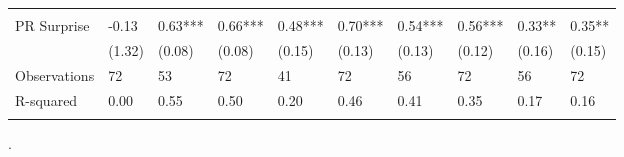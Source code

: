 \documentclass{article}
\begin{document}
\begin{table}[tbp] \centering
{}

\label{tab:}
\begin{tabularx}{\linewidth}{lCCCCCCCCC}

\toprule
 \tabularnewline
PR Surprise&-0.13&0.63***&0.66***&0.48***&0.70***&0.54***&0.56***&0.33**&0.35** \tabularnewline
&(1.32)&(0.08)&(0.08)&(0.15)&(0.13)&(0.13)&(0.12)&(0.16)&(0.15) \tabularnewline
\midrule Observations&72&53&72&41&72&56&72&56&72 \tabularnewline
R-squared&0.00&0.55&0.50&0.20&0.46&0.41&0.35&0.17&0.16 \tabularnewline
\bottomrule \addlinespace[0cm]

\end{tabularx}
\begin{flushleft}
\footnotesize .
\end{flushleft}
\end{table}
\end{document}

